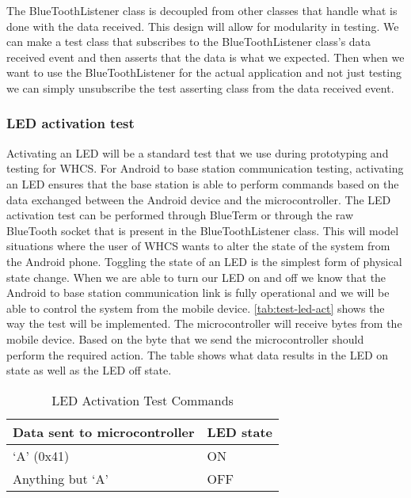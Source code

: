The BlueToothListener class is decoupled from other classes that handle what is
done with the data received. This design will allow for modularity in testing.
We can make a test class that subscribes to the BlueToothListener class{}'s
data received event and then asserts that the data is what we expected. Then
when we want to use the BlueToothListener for the actual application and not
just testing we can simply unsubscribe the test asserting class from the data
received event.

\subsubsection{LED activation test}
Activating an LED will be a standard test that we use during prototyping and
testing for WHCS. For Android to base station communication testing, activating
an LED ensures that the base station is able to perform commands based on the
data exchanged between the Android device and the microcontroller. The LED
activation test can be performed through BlueTerm or through the raw BlueTooth
socket that is present in the BlueToothListener class. This will model
situations where the user of WHCS wants to alter the state of the system from
the Android phone. Toggling the state of an LED is the simplest form of
physical state change. When we are able to turn our LED on and off we know that
the Android to base station communication link is fully operational and we will
be able to control the system from the mobile device.  \autoref{tab:test-led-act}
shows the way the test will be implemented. The microcontroller will receive
bytes from the mobile device. Based on the byte that we send the
microcontroller should perform the required action. The table shows what data
results in the LED on state as well as the LED off state.

\begin{table}[H]
\centering
\begin{tabular}{|l|l|}
\hline
{\color{black} Data sent to microcontroller} &
{\color{black} LED state}\\\hline
{\color{black} {}`A{}' (0x41)} &
{\color{black} ON}\\\hline
{\color{black} Anything but {}`A{}'} &
{\color{black} OFF}\\\hline
\end{tabular}
\caption{LED Activation Test Commands}
\label{tab:test-led-act}
\end{table}
